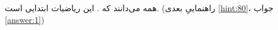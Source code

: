 \section{}
\paragraph{}\label{hint:165}
همه می‌دانند که . این ریاضیات ابتدایی است. (راهنماییِ بعدی \ref{hint:80}، جواب \ref{answer:1})
